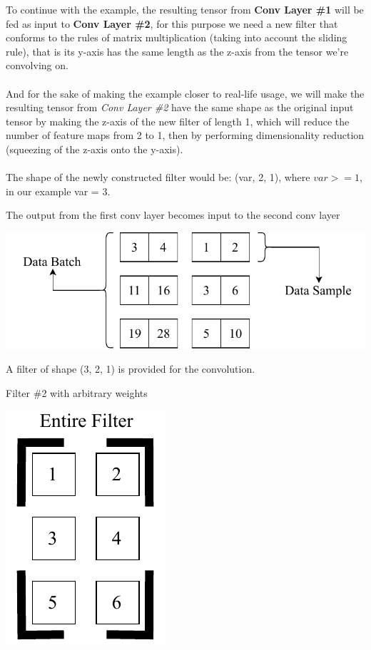 \documentclass[a4paper, 12pt]{report}
\newcommand\tab[1][1cm]{\hspace*{#1}}
\begin{document}
To continue with the example, the resulting tensor from \textbf{Conv Layer \#1} will be fed as input to \textbf{Conv Layer \#2}, for this purpose we need a new filter that conforms to the rules of matrix multiplication (taking into account the sliding rule), that is its y-axis has the same length as the z-axis from the tensor we're convolving on.\\\\
And for the sake of making the example closer to real-life usage, we will make the resulting tensor from \textit{Conv Layer \#2} have the same shape as the original input tensor by making the z-axis of the new filter of length 1, which will reduce the number of feature maps from 2 to 1, then by performing dimensionality reduction (squeezing of the z-axis onto the y-axis).\\\\
The shape of the newly constructed filter would be: (var, 2, 1), where $ var >= 1 $, in our example var = 3.
\begin{blockfigure}{The output from the first conv layer becomes input to the second conv layer}
	\begin{center}
		\includegraphics[width=\textwidth]{secondinput_final}
	\end{center}
\end{blockfigure}
\begin{tcbraster}[raster columns=2,raster rows=1,
	enhanced,size=small,fit algorithm=hybrid* ]
	\begin{tcolorbox}[frame hidden,colback=white]
		\tab A filter of shape (3, 2, 1) is provided \tab for the convolution.
	\end{tcolorbox}
	\begin{inlinefigure}{Filter \#2 with arbitrary weights}
		\begin{center}
			\includegraphics[height=0.25\textheight]{filter2}
		\end{center}
	\end{inlinefigure}
\end{tcbraster}
\end{document}
